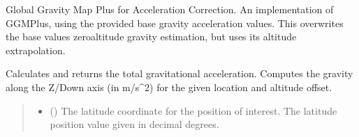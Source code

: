\documentclass[letterpaper,10pt,english]{sphinxmanual}
\begin{document}
\begin{fulllineitems}
\label{\detokenize{modules/gravity/ggm_plus:qnav.gravity.ggm_plus.GGMPlusAcc}}
\pysigstartsignatures
{}
\pysigstopsignatures
\sphinxAtStartPar
Global Gravity Map Plus for Acceleration Correction.
An implementation of GGMPlus, using the provided base gravity
acceleration values. This overwrites the base values zero\sphinxhyphen{}altitude
gravity estimation, but uses its altitude extrapolation.

\begin{fulllineitems}
\label{\detokenize{modules/gravity/ggm_plus:qnav.gravity.ggm_plus.GGMPlusAcc.calc_gravity_z}}
\pysigstartsignatures
{}
\pysigstopsignatures
\sphinxAtStartPar
Calculates and returns the total gravitational acceleration.
Computes the gravity along the Z/Down axis (in m/s\textasciicircum{}2) for
the given location and altitude offset.
\begin{quote}\begin{description}
\begin{itemize}
\item {} 
\sphinxAtStartPar
{} () \textendash{} The latitude coordinate for the position of interest.
The latitude position value given in decimal degrees.


\end{itemize}
\end{description}
\end{quote}
\end{fulllineitems}
\end{fulllineitems}
\end{document}
